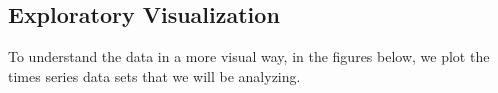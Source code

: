 \documentclass[10pt,a4paper]{article}
\begin{document}
\subsection{Exploratory Visualization}
%
%
To understand the data in a more visual way, in the figures below, we plot the times series data sets that we will be analyzing.
\end{document}
